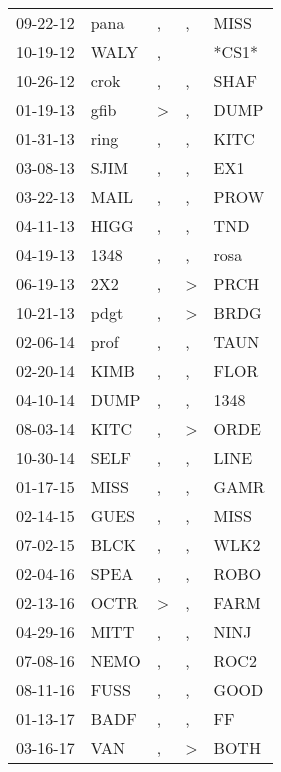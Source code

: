 \begin{supertabular}{lllll}
 09-22-12 &   pana &             , &             , &   MISS \\
 10-19-12 &   WALY &             , &               &  *CS1* \\
 10-26-12 &   crok &             , &             , &   SHAF \\
 01-19-13 &   gfib &  \textgreater &             , &   DUMP \\
 01-31-13 &   ring &             , &             , &   KITC \\
 03-08-13 &   SJIM &             , &             , &    EX1 \\
 03-22-13 &   MAIL &             , &             , &   PROW \\
 04-11-13 &   HIGG &             , &             , &    TND \\
 04-19-13 &   1348 &             , &             , &   rosa \\
 06-19-13 &    2X2 &             , &  \textgreater &   PRCH \\
 10-21-13 &   pdgt &             , &  \textgreater &   BRDG \\
 02-06-14 &   prof &             , &             , &   TAUN \\
 02-20-14 &   KIMB &             , &             , &   FLOR \\
 04-10-14 &   DUMP &             , &             , &   1348 \\
 08-03-14 &   KITC &             , &  \textgreater &   ORDE \\
 10-30-14 &   SELF &             , &             , &   LINE \\
 01-17-15 &   MISS &             , &             , &   GAMR \\
 02-14-15 &   GUES &             , &             , &   MISS \\
 07-02-15 &   BLCK &             , &             , &   WLK2 \\
 02-04-16 &   SPEA &             , &             , &   ROBO \\
 02-13-16 &   OCTR &  \textgreater &             , &   FARM \\
 04-29-16 &   MITT &             , &             , &   NINJ \\
 07-08-16 &   NEMO &             , &             , &   ROC2 \\
 08-11-16 &   FUSS &             , &             , &   GOOD \\
 01-13-17 &   BADF &             , &             , &     FF \\
 03-16-17 &    VAN &             , &  \textgreater &   BOTH \\

\end{supertabular}
